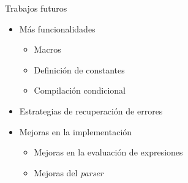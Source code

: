 \documentclass{beamer}
\begin{document}
    \begin{frame}{Trabajos futuros}
        \begin{itemize}
            \item Más funcionalidades
            \begin{itemize}
                \item Macros
                \item Definición de constantes
                \item Compilación condicional
            \end{itemize}
            \item Estrategias de recuperación de errores
            \item Mejoras en la implementación
            \begin{itemize}
                \item Mejoras en la evaluación de expresiones
                \item Mejoras del \textit{parser}
            \end{itemize}
        \end{itemize}
    \end{frame}
\end{document}
